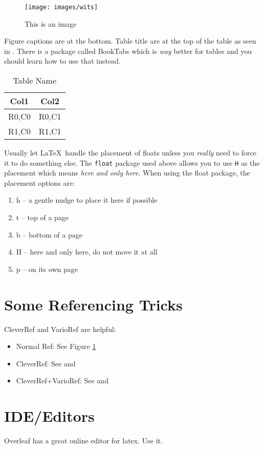 \documentclass[a4paper,twoside,12pt]{report}
\begin{document}
\begin{figure}[ht]
	\centering
	\texttt{[image: images/wits]}
	\caption{This is an image}
	\label{fig:thing1}
\end{figure}

Figure captions are at the bottom. Table title are at the top of the table as seen in . There is a package called BookTabs which is \textit{way} better for tables and you should learn how to use that instead.

\begin{table}[p]
	\centering
	\caption{Table Name}
	\label{tab:tab1}
\begin{tabular}{cc}
	\hline
	Col1 & Col2\\
	\hline\hline 
	R0,C0 & R0,C1 \\ 
	R1,C0 & R1,C1 \\ 
	\hline
\end{tabular} 
\end{table}

Usually let \LaTeX\ handle the placement of floats unless you \textit{really} need to force it to do something else. The \texttt{float} package used above allows you to use \texttt{H} as the placement which means \textit{here and only here}. When using the float package, the placement options are:
\begin{enumerate}
\item h -- a gentle nudge to place it here if possible
\item t -- top of a page
\item b -- bottom of a page
\item H -- here and only here, do not move it at all
\item p -- on its own page
\end{enumerate}


\chapter{Some Referencing Tricks}
CleverRef and VarioRef are helpful:
\begin{itemize}
	\item Normal Ref: See Figure \ref{fig:thing1}
	\item CleverRef: See  and 
	\item CleverRef+VarioRef: See  and 
\end{itemize}

\chapter{IDE/Editors}
Overleaf has a great online editor for latex. Use it. 
\end{document}
